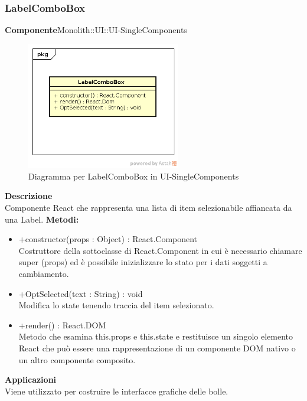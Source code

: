 \subsubsection{LabelComboBox}
\textbf{Componente}Monolith::UI::UI-SingleComponents\\
   \FloatBarrier
   \begin{figure}[ht]
   \centering
   \includegraphics[width=0.6\textwidth]{img/single-LabelComboBox}
   \caption{{Diagramma per LabelComboBox in UI-SingleComponents}}
\end{figure}
\FloatBarrier
\textbf{Descrizione}\\
Componente React che rappresenta una lista di item selezionabile affiancata da una Label.
\textbf{Metodi:} \begin{itemize}\item +constructor(props : Object) : React.Component \\Costruttore della sottoclasse di React.Component in cui è necessario chiamare super (props) ed è possibile inizializzare lo stato per i dati soggetti a cambiamento.\item +OptSelected(text : String) : void \\Modifica lo state tenendo traccia del item selezionato.\item +render() : React.DOM \\Metodo che esamina this.props e this.state e restituisce un singolo elemento React che può essere una rappresentazione di un componente DOM nativo o un altro componente composito.\end{itemize} 


\textbf{Applicazioni}\\
Viene utilizzato per costruire le interfacce grafiche delle bolle. 


\clearpage

